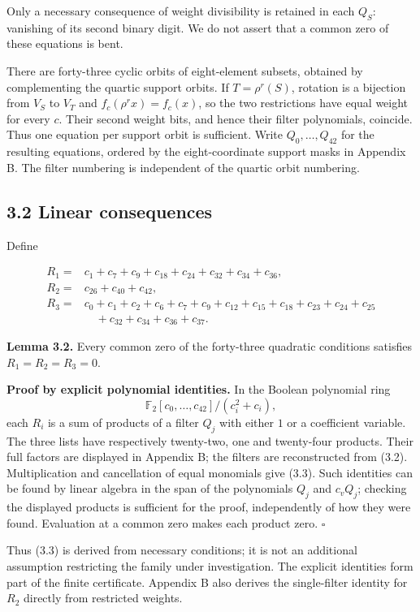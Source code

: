\documentclass[11pt,a4paper]{article}
\begin{document}
Only a necessary consequence of weight divisibility is retained in each $Q_S$: vanishing of its second binary digit. We do not assert that a common zero of these equations is bent.

There are forty-three cyclic orbits of eight-element subsets, obtained by complementing the quartic support orbits. If $T=\rho^r(S)$, rotation is a bijection from $V_S$ to $V_T$ and $f_c(\rho^r x)=f_c(x)$, so the two restrictions have equal weight for every $c$. Their second weight bits, and hence their filter polynomials, coincide. Thus one equation per support orbit is sufficient. Write $Q_0,\ldots,Q_{42}$ for the resulting equations, ordered by the eight-coordinate support masks in Appendix B. The filter numbering is independent of the quartic orbit numbering.

\subsection*{3.2 Linear consequences}

Define

\[
\begin{aligned}
R_1={}&c_1+c_7+c_9+c_{18}+c_{24}+c_{32}+c_{34}+c_{36},\\
R_2={}&c_{26}+c_{40}+c_{42},\\
R_3={}&c_0+c_1+c_2+c_6+c_7+c_9+c_{12}+c_{15}+c_{18}
       +c_{23}+c_{24}+c_{25}\\&\quad+c_{32}+c_{34}+c_{36}+c_{37}.
\end{aligned} \tag{3.3}
\]

\textbf{Lemma 3.2.} Every common zero of the forty-three quadratic conditions satisfies $R_1=R_2=R_3=0$.

\textbf{Proof by explicit polynomial identities.} In the Boolean polynomial ring
\[\mathbb F_2[c_0,\ldots,c_{42}]/(c_i^2+c_i),\]
each $R_i$ is a sum of products of a filter $Q_j$ with either $1$ or a coefficient variable. The three lists have respectively twenty-two, one and twenty-four products. Their full factors are displayed in Appendix B; the filters are reconstructed from (3.2). Multiplication and cancellation of equal monomials give (3.3). Such identities can be found by linear algebra in the span of the polynomials $Q_j$ and $c_vQ_j$; checking the displayed products is sufficient for the proof, independently of how they were found. Evaluation at a common zero makes each product zero. \hfill$\square$

Thus (3.3) is derived from necessary conditions; it is not an additional assumption restricting the family under investigation. The explicit identities form part of the finite certificate. Appendix B also derives the single-filter identity for $R_2$ directly from restricted weights.
\end{document}
